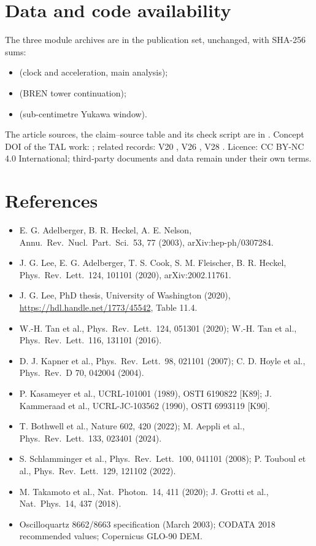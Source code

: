 \documentclass[11pt,a4paper]{article}
\begin{document}
\section*{Data and code availability}\label{sec:avail}
The three module archives are in the publication set, unchanged, with SHA-256 sums:
\begin{itemize}\setlength{\itemsep}{0pt}
\item {} (clock and acceleration, main analysis);
\item {} (BREN tower continuation);
\item {} (sub-centimetre Yukawa window).
\end{itemize} The article sources, the claim--source
table and its check script are in . Concept DOI of the TAL work: ; related records:
V20 , V26 , V28 .
Licence: CC BY-NC 4.0 International; third-party documents and data remain under their own terms.

\section*{References}
\footnotesize
\begin{itemize}\setlength{\itemsep}{0pt}
\item E. G. Adelberger, B. R. Heckel, A. E. Nelson, Annu.\ Rev.\ Nucl.\ Part.\ Sci.\ 53, 77 (2003), arXiv:hep-ph/0307284.
\item J. G. Lee, E. G. Adelberger, T. S. Cook, S. M. Fleischer, B. R. Heckel, Phys.\ Rev.\ Lett.\ 124, 101101 (2020), arXiv:2002.11761.
\item J. G. Lee, PhD thesis, University of Washington (2020), \url{https://hdl.handle.net/1773/45542}, Table 11.4.
\item W.-H. Tan et al., Phys.\ Rev.\ Lett.\ 124, 051301 (2020); W.-H. Tan et al., Phys.\ Rev.\ Lett.\ 116, 131101 (2016).
\item D. J. Kapner et al., Phys.\ Rev.\ Lett.\ 98, 021101 (2007); C. D. Hoyle et al., Phys.\ Rev.\ D 70, 042004 (2004).
\item P. Kasameyer et al., UCRL-101001 (1989), OSTI 6190822 [K89]; J. Kammeraad et al., UCRL-JC-103562 (1990), OSTI 6993119 [K90].
\item T. Bothwell et al., Nature 602, 420 (2022); M. Aeppli et al., Phys.\ Rev.\ Lett.\ 133, 023401 (2024).
\item S. Schlamminger et al., Phys.\ Rev.\ Lett.\ 100, 041101 (2008); P. Touboul et al., Phys.\ Rev.\ Lett.\ 129, 121102 (2022).
\item M. Takamoto et al., Nat.\ Photon.\ 14, 411 (2020); J. Grotti et al., Nat.\ Phys.\ 14, 437 (2018).
\item Oscilloquartz 8662/8663 specification (March 2003); CODATA 2018 recommended values; Copernicus GLO-90 DEM.
\end{itemize}
\end{document}
